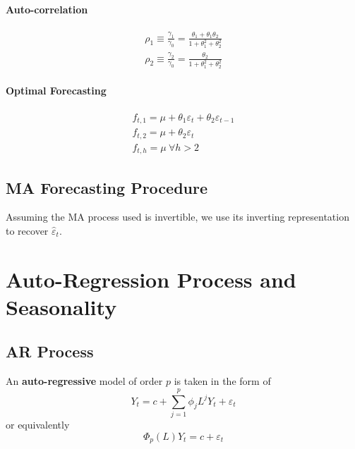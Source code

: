 \documentclass[11pt]{article}
\begin{document}
			\paragraph{Auto-correlation}
				\begin{gather}
					\rho_1 \equiv \frac{\gamma_1}{\gamma_0} = \frac{\theta_1 + \theta_1 \theta_2}{1 + \theta_1^2 + \theta_2^2} \\
					\rho_2 \equiv \frac{\gamma_2}{\gamma_0} = \frac{\theta_2}{1 + \theta_1^2 + \theta_2^2}
				\end{gather}
			\paragraph{Optimal Forecasting}
				\begin{gather}
					f_{t, 1} = \mu + \theta_1 \varepsilon_t + \theta_2 \varepsilon_{t-1} \\
					f_{t, 2} = \mu + \theta_2 \varepsilon_t \\
					f_{t, h} = \mu\ \forall h > 2
				\end{gather}
			
		\subsection{MA Forecasting Procedure}
			\begin{remark}
				Assuming the MA process used is invertible, we use its inverting representation to recover $\hat{\varepsilon}_t$.
			\end{remark}
	
	\section{Auto-Regression Process and Seasonality}
		\subsection{AR Process}
			\begin{definition}
				An \textbf{auto-regressive} model of order $p$ is taken in the form of 
				\begin{equation}
					Y_t = c + \sum_{j=1}^p \phi_j L^j Y_t + \varepsilon_t
				\end{equation}
				or equivalently
				\begin{equation}
					\Phi_p(L) Y_t = c + \varepsilon_t
				\end{equation}
			\end{definition}
			
\end{document}
